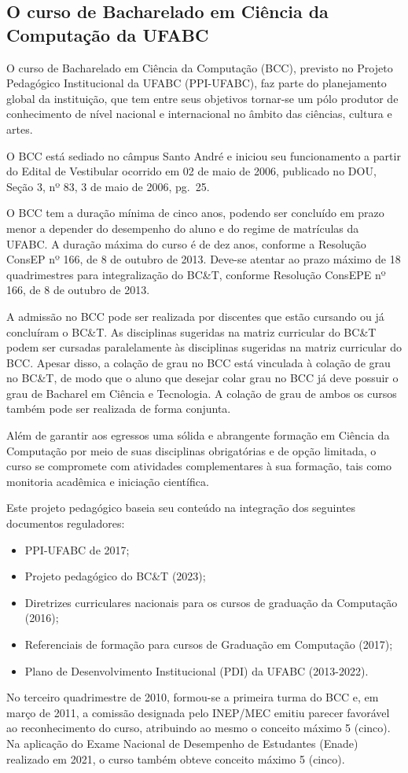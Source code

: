 \subsection{O curso de Bacharelado em Ciência da Computação da UFABC}

O curso de Bacharelado em Ciência da Computação (BCC), previsto no Projeto
Pedagógico Institucional da UFABC (PPI-UFABC), faz parte do planejamento global
da instituição, que tem entre seus objetivos tornar-se um pólo produtor de
conhecimento de nível nacional e internacional no âmbito das ciências, cultura
e artes.

O BCC está sediado no câmpus Santo André e iniciou seu funcionamento a partir
do Edital de Vestibular ocorrido em 02 de maio de 2006, publicado no DOU,
Seção 3, nº 83, 3 de maio de 2006, pg.\ 25.

O BCC tem a duração mínima de cinco anos, podendo ser concluído em prazo menor
a depender do desempenho do aluno e do regime de matrículas da UFABC.
A duração máxima do curso é de dez anos, conforme a Resolução ConsEP nº 166,
de 8 de outubro de 2013.
Deve-se atentar ao prazo máximo de 18 quadrimestres para integralização do
BC\&T, conforme Resolução ConsEPE nº 166, de 8 de outubro de 2013.

A admissão no BCC pode ser realizada por discentes que estão cursando ou já
concluíram o BC\&T.
As disciplinas sugeridas na matriz curricular do BC\&T podem ser cursadas
paralelamente às disciplinas sugeridas na matriz curricular do BCC.
Apesar disso, a colação de grau no BCC está vinculada à colação de grau no
BC\&T, de modo que o aluno que desejar colar grau no BCC já deve possuir o grau
de Bacharel em Ciência e Tecnologia.
A colação de grau de ambos os cursos também pode ser realizada de forma conjunta.

Além de garantir aos egressos uma sólida e abrangente formação em Ciência da
Computação por meio de suas disciplinas obrigatórias e de opção limitada, o
curso se compromete com atividades complementares à sua formação, tais como
monitoria acadêmica e iniciação científica.

Este projeto pedagógico baseia seu conteúdo na integração dos seguintes
documentos reguladores:
\begin{itemize}
    \item PPI-UFABC de 2017;
    \item Projeto pedagógico do BC\&T (2023);
    \item Diretrizes curriculares nacionais para os cursos de graduação da Computação (2016);
    \item Referenciais de formação para cursos de Graduação em Computação (2017);
    \item Plano de Desenvolvimento Institucional (PDI) da UFABC (2013-2022).
\end{itemize}

No terceiro quadrimestre de 2010, formou-se a primeira turma do BCC e, em março
de 2011, a comissão designada pelo INEP/MEC emitiu parecer favorável ao
reconhecimento do curso, atribuindo ao mesmo o conceito máximo 5 (cinco).
Na aplicação do Exame Nacional de Desempenho de Estudantes (Enade) realizado em
2021, o curso também obteve conceito máximo 5 (cinco).
